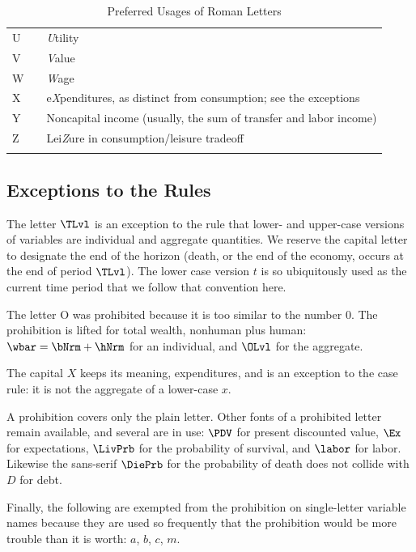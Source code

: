 \documentclass{econark}
\begin{document}
\begin{table}[ht]
\begin{tabular}{|lcl|}
    U & & \textit{U}tility\\
    V & & \textit{V}alue\\
    W & & \textit{W}age\\
    X & & e\textit{X}penditures, as distinct from consumption; see the exceptions\\
    Y & & Noncapital income (usually, the sum of transfer and labor income)\\
    Z & & Lei\textit{Z}ure in consumption/leisure tradeoff\\
  \\ \hline
  \end{tabular}
  \caption{Preferred Usages of Roman Letters}
  \label{table:RomanLetters}
\end{table}

\subsection{Exceptions to the Rules}

The letter $\TLvl$ is an exception to the rule that lower- and upper-case versions of variables are individual and aggregate quantities.  We reserve the capital letter to designate the end of the horizon (death, or the end of the economy, occurs at the end of period $\TLvl$).  The lower case version $t$ is so ubiquitously used as the current time period that we follow that convention here.

The letter O was prohibited because it is too similar to the number 0.  The prohibition is lifted for total wealth, nonhuman plus human: $\wbar = \bNrm + \hNrm$ for an individual, and $\OLvl$ for the aggregate.

The capital $X$ keeps its meaning, expenditures, and is an exception to the case rule: it is not the aggregate of a lower-case $x$.

A prohibition covers only the plain letter.  Other fonts of a prohibited letter remain available, and several are in use: $\PDV$ for present discounted value, $\Ex$ for expectations, $\LivPrb$ for the probability of survival, and $\labor$ for labor.  Likewise the sans-serif $\DiePrb$ for the probability of death does not collide with $D$ for debt.

Finally, the following are exempted from the prohibition on single-letter variable names because they are used so frequently that the prohibition would be more trouble than it is worth: $a$, $b$, $c$, $m$.

\pagebreak
\end{document}

